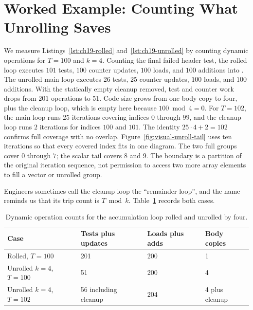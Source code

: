 \section{Worked Example: Counting What Unrolling Saves}
\label{sec:ch19-worked-counts}

We measure Listings~\ref{lst:ch19-rolled} and~\ref{lst:ch19-unrolled} by counting dynamic operations for $T = 100$ and $k = 4$.
Counting the final failed header test, the rolled loop executes $101$ tests, $100$ counter updates, $100$ loads, and $100$ additions into .
The unrolled main loop executes $26$ tests, $25$ counter updates, $100$ loads, and $100$ additions.
With the statically empty cleanup removed, test and counter work drops from $201$ operations to $51$.
Code size grows from one body copy to four, plus the cleanup loop, which is empty here because $100 \bmod 4 = 0$.
For $T = 102$, the main loop runs $25$ iterations covering indices $0$ through $99$, and the cleanup loop runs $2$ iterations for indices $100$ and $101$.
The identity $25 \cdot 4 + 2 = 102$ confirms full coverage with no overlap.
Figure~\ref{fig:visual-unroll-tail} uses ten iterations so that every covered index fits in one diagram.
The two full groups cover $0$ through $7$; the scalar tail covers $8$ and $9$.
The boundary is a partition of the original iteration sequence, not permission to access two more array elements to fill a vector or unrolled group.



Engineers sometimes call the cleanup loop the \enquote{remainder loop}, and the name reminds us that its trip count is $T \bmod k$.
Table~\ref{tab:ch19-counts} records both cases.

\begin{table}
  \centering
  \caption{Dynamic operation counts for the accumulation loop rolled and unrolled by four.}
  \label{tab:ch19-counts}
  \begin{tabular}{llll}
    \toprule
    Case & Tests plus updates & Loads plus adds & Body copies \\
    \midrule
    Rolled, $T = 100$ & 201 & 200 & 1 \\
    Unrolled $k = 4$, $T = 100$ & 51 & 200 & 4 \\
    Unrolled $k = 4$, $T = 102$ & 56 including cleanup & 204 & 4 plus cleanup \\
    \bottomrule
  \end{tabular}
\end{table}

